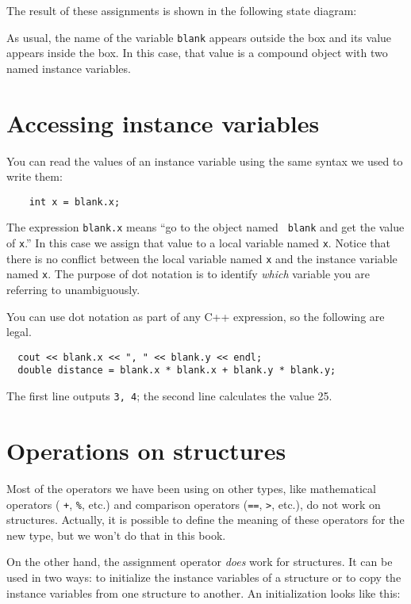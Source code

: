 The result of these assignments is shown in the following
state diagram:

\vspace{0.1in}
\centerline{}
\vspace{0.1in}

As usual, the name of the variable {\tt blank} appears outside the box
and its value appears inside the box.  In this case, that value is
a compound object with two named instance variables.

\section{Accessing instance variables}

You can read the values of an instance variable using the same syntax we
used to write them:

\begin{verbatim}
    int x = blank.x;
\end{verbatim}
%
The expression {\tt blank.x} means ``go to the object named {\tt
blank} and get the value of {\tt x}.''  In this case we assign that
value to a local variable named {\tt x}.  Notice that there is no
conflict between the local variable named {\tt x} and the instance
variable named {\tt x}.  The purpose of dot notation is to identify
{\em which} variable you are referring to unambiguously.

You can use dot notation as part of any C++ expression, so the
following are legal.

\begin{verbatim}
  cout << blank.x << ", " << blank.y << endl;
  double distance = blank.x * blank.x + blank.y * blank.y;
\end{verbatim}
%
The first line outputs {\tt 3, 4}; the second line calculates
the value 25.

\section{Operations on structures}

Most of the operators we have been using on other types, like
mathematical operators ( {\tt +}, {\tt \%}, etc.) and comparison
operators ({\tt ==}, {\tt >}, etc.), do not work on structures.
Actually, it is possible to define the meaning of these operators
for the new type, but we won't do that in this book.

On the other hand, the assignment operator {\em does} work for
structures.  It can be used in two ways: to initialize the instance
variables of a structure or to copy the instance variables from one
structure to another.  An initialization looks like this:


